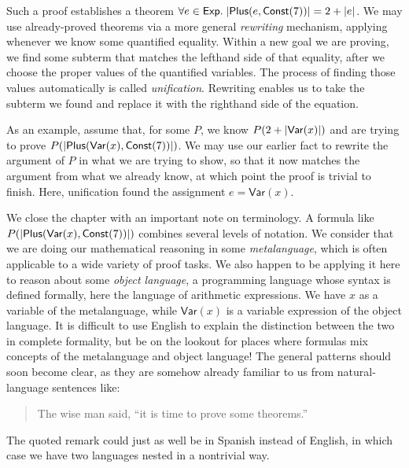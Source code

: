 \documentclass{amsbook}
\theoremstyle{definition}
\theoremstyle{remark}
\numberwithin{section}{chapter}
\numberwithin{equation}{chapter}
\begin{document}
\medskip

Such a proof establishes a theorem $\forall e \in \mathsf{Exp}. \; {\left \lvert \mathsf{Plus}(e, \mathsf{Const}(7)) \right \rvert} = 2 + {\left \lvert e \right \rvert}$.
We may use already-proved theorems via a more general \emph{rewriting} mechanism, applying whenever we know some quantified equality.
Within a new goal we are proving, we find some subterm that matches the lefthand side of that equality, after we choose the proper values of the quantified variables.
The process of finding those values automatically is called \emph{unification}.
Rewriting enables us to take the subterm we found and replace it with the righthand side of the equation.

As an example, assume that, for some $P$, we know $P(2 + {\left \lvert \mathsf{Var}(x) \right \rvert})$ and are trying to prove $P({\left \lvert \mathsf{Plus}(\mathsf{Var}(x), \mathsf{Const}(7)) \right \rvert})$.
We may use our earlier fact to rewrite the argument of $P$ in what we are trying to show, so that it now matches the argument from what we already know, at which point the proof is trivial to finish.
Here, unification found the assignment $e = \mathsf{Var}(x)$.

\medskip

\encoding
\label{metalanguage}
We close the chapter with an important note on terminology.
A formula like $P({\left \lvert \mathsf{Plus}(\mathsf{Var}(x), \mathsf{Const}(7)) \right \rvert})$ combines several levels of notation.
We consider that we are doing our mathematical reasoning in some \emph{metalanguage}, which is often applicable to a wide variety of proof tasks.
We also happen to be applying it here to reason about some \emph{object language}, a programming language whose syntax is defined formally, here the language of arithmetic expressions.
We have $x$ as a variable of the metalanguage, while $\mathsf{Var}(x)$ is a variable expression of the object language.
It is difficult to use English to explain the distinction between the two in complete formality, but be on the lookout for places where formulas mix concepts of the metalanguage and object language!
The general patterns should soon become clear, as they are somehow already familiar to us from natural-language sentences like:
\begin{quote}
  The wise man said, ``it is time to prove some theorems.''
\end{quote}
The quoted remark could just as well be in Spanish instead of English, in which case we have two languages nested in a nontrivial way.
\end{document}
